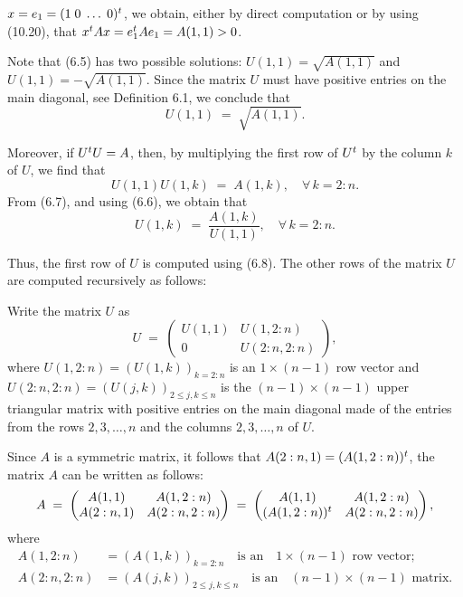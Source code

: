 
$x = e_1 = (1 \; 0 \; \ldots \; 0)^{t}$, we obtain, either by direct computation or by
using (10.20), that $x^{t} Ax = e_1^{t} Ae_1 = A(1,1) > 0$.

Note that (6.5) has two possible solutions: $U(1,1) = \sqrt{A(1,1)}$ and $U(1,1) =
-\sqrt{A(1,1)}$. Since the matrix $U$ must have positive entries on the main diagonal,
see Definition 6.1, we conclude that
\begin{equation}
U(1,1) \;=\; \sqrt{A(1,1)}.
\end{equation}

Moreover, if $U^{t} U = A$, then, by multiplying the first row of $U^{t}$ by the column
$k$ of $U$, we find that
\begin{equation}
U(1,1)U(1,k) \;=\; A(1,k), \quad \forall\, k = 2:n.
\end{equation}
From (6.7), and using (6.6), we obtain that
\begin{equation}
U(1,k) \;=\; \frac{A(1,k)}{U(1,1)}, \quad \forall\, k = 2:n.
\end{equation}

Thus, the first row of $U$ is computed using (6.8). The other rows of the matrix $U$
are computed recursively as follows:

Write the matrix $U$ as
\begin{equation}
U \;=\; \begin{pmatrix} U(1,1) & U(1,2:n) \\ 0 & U(2:n,2:n) \end{pmatrix},
\end{equation}
where $U(1,2:n) = (U(1,k))_{k=2:n}$ is an $1 \times (n-1)$ row vector and $U(2:n,2:n) =
(U(j,k))_{2 \leq j,k \leq n}$ is the $(n-1) \times (n-1)$ upper triangular matrix with
positive entries on the main diagonal made of the entries from the rows $2, 3,
\ldots, n$ and the columns $2, 3, \ldots, n$ of $U$.

Since $A$ is a symmetric matrix, it follows that $A(2:n,1) = (A(1,2:n))^{t}$, the matrix
$A$ can be written as follows:
\begin{equation}
A \;=\; \begin{pmatrix} A(1,1) & A(1,2:n) \\ A(2:n,1) & A(2:n,2:n) \end{pmatrix} \;=\;
\begin{pmatrix} A(1,1) & A(1,2:n) \\ (A(1,2:n))^{t} & A(2:n,2:n) \end{pmatrix},
\end{equation}
where
\begin{align*}
A(1,2:n) &= (A(1,k))_{k=2:n} \quad \text{is an} \quad 1 \times (n-1) \text{ row
vector;} \\
A(2:n,2:n) &= (A(j,k))_{2 \leq j,k \leq n} \quad \text{is an} \quad (n-1) \times (n-1)
\text{ matrix.}
\end{align*}

